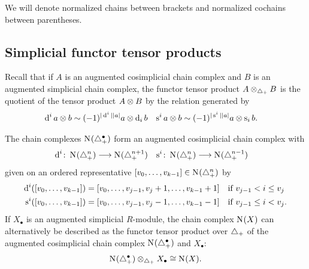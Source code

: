 \begin{notation}
	We will denote normalized chains between brackets and normalized cochains between parentheses.
\end{notation}

\subsection{Simplicial functor tensor products}\label{s:functortensor}

Recall that if $A$ is an augmented cosimplicial chain complex and $B$ is an augmented simplicial chain complex, the functor tensor product $A \otimes_{\triangle_{+}} B$ is the quotient of the tensor product $A \otimes B$ by the relation generated by
\begin{align*}
	\operatorname{d}^i a \otimes b &\sim (-1)^{|\operatorname{d}^i||a|}a \otimes \operatorname{d}_i b
	&
	\operatorname{s}^ia \otimes b &\sim (-1)^{|\operatorname{s}^i||a|}a \otimes \operatorname{s}_ib.
\end{align*}

The chain complexes $\operatorname{N}_{}(\triangle_{+}^\bullet)$ form an augmented cosimplicial chain complex with
\begin{align*}
	\operatorname{d}^i \colon \operatorname{N}_{}(\triangle_{+}^n)& \longrightarrow \operatorname{N}_{}(\triangle_{+}^{n+1})
	&
	\operatorname{s}^i \colon \operatorname{N}_{}(\triangle_{+}^{n})& \longrightarrow \operatorname{N}_{}(\triangle_{+}^{n-1})
\end{align*}
given on an ordered representative $[v_0,\dots,v_{k-1}]\in \operatorname{N}_{}(\triangle_{+}^n)$ by
\begin{align*}
\operatorname{d}^i([v_0,\dots,v_{k-1}]) &= [v_0,\dots,v_{j-1},v_j+1,\dots,v_{k-1}+1] \quad \text{if $v_{j-1}<i\leq v_j$}
\\
\operatorname{s}^i([v_0,\dots,v_{k-1}]) &= [v_0,\dots,v_{j-1},v_j-1,\dots,v_{k-1}-1] \quad \text{if $v_{j-1} \leq i < v_j$}.
\end{align*}
If $X_\bullet$ is an augmented simplicial $R$-module, the chain complex $\operatorname{N}_{}(X)$ can alternatively be described as the functor tensor product over $\triangle_{+}$ of the augmented cosimplicial chain complex $\operatorname{N}_{}(\triangle_{+}^{\bullet})$ and $X_\bullet$:
\begin{equation}\label{eq:1} 
 \operatorname{N}_{}(\triangle_{+}^\bullet) \otimes_{\triangle_{+}} X_\bullet
 \cong	
 \operatorname{N}_{}(X).
\end{equation}



